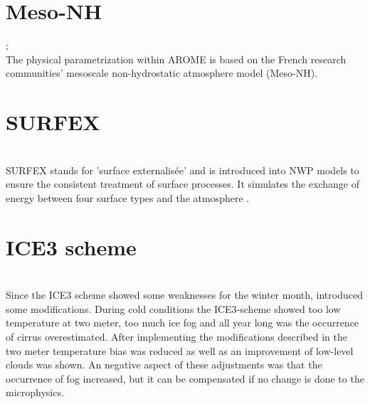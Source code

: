 \section{Meso-NH}
\cite{meteo_france_meso-nh_2009}; 
\cite{seity_arome-france_2010} \\
The physical parametrization within AROME is based on the French research communities' mesoscale non-hydrostatic atmosphere model (Meso-NH). %

\section{SURFEX}
\cite{masson_surfexv7.2_2013} \\
SURFEX stands for 'surface externalisée' and is introduced into NWP models to ensure the consistent treatment of surface processes. It simulates the exchange of energy between four surface types and the atmosphere \citep{homleid_verification_2016}.

\section{ICE3 scheme}
\cite{pinty_mixed-phased_1998} \\
Since the ICE3 scheme showed some weaknesses for the winter month, introduced \cite{muller_arome-metcoop:_2017} some modifications. 
During cold conditions the ICE3-scheme showed too low temperature at two meter, too much ice fog and all year long was the occurrence of cirrus overestimated. After implementing the modifications described in \cite{muller_arome-metcoop:_2017} the two meter temperature bias was reduced as well as an improvement of low-level clouds was shown. An negative aspect of these adjustments was that the occurrence of fog increased, but it can be compensated if no change is done to the microphysics. 


%
